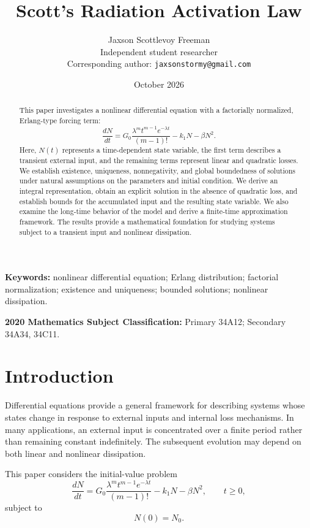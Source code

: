 \documentclass[12pt]{article}
\title{\textbf{Scott's Radiation Activation Law}}
\author{Jaxson Scottlevoy Freeman\\
\small Independent student researcher\\
\small Corresponding author: \texttt{jaxsonstormy@gmail.com}}
\date{October 2026}
\theoremstyle{definition}
\theoremstyle{remark}
\begin{document}
\maketitle

\begin{abstract}
This paper investigates a nonlinear differential equation
with a factorially normalized, Erlang-type forcing term:
\[
\frac{dN}{dt}
=
G_0\frac{\lambda^m t^{m-1}e^{-\lambda t}}{(m-1)!}
-k_1N-\beta N^2.
\]
Here, \(N(t)\) represents a time-dependent state variable,
the first term describes a transient external input, and
the remaining terms represent linear and quadratic losses.
We establish existence, uniqueness, nonnegativity, and
global boundedness of solutions under natural assumptions
on the parameters and initial condition. We derive an
integral representation, obtain an explicit solution in
the absence of quadratic loss, and establish bounds for
the accumulated input and the resulting state variable.
We also examine the long-time behavior of the model and
derive a finite-time approximation framework. The results
provide a mathematical foundation for studying systems
subject to a transient input and nonlinear dissipation.
\end{abstract}

\noindent\textbf{Keywords:} nonlinear differential equation;
Erlang distribution; factorial normalization; existence
and uniqueness; bounded solutions; nonlinear dissipation.

\medskip
\noindent\textbf{2020 Mathematics Subject Classification:}
Primary 34A12; Secondary 34A34, 34C11.

\section{Introduction}

Differential equations provide a general framework for
describing systems whose states change in response to
external inputs and internal loss mechanisms. In many
applications, an external input is concentrated over a
finite period rather than remaining constant indefinitely.
The subsequent evolution may depend on both linear and
nonlinear dissipation.

This paper considers the initial-value problem
\begin{equation}
\frac{dN}{dt}
=
G_0\frac{\lambda^m t^{m-1}e^{-\lambda t}}{(m-1)!}
-k_1N-\beta N^2,
\qquad t\geq 0,
\label{eq:model}
\end{equation}
subject to
\begin{equation}
N(0)=N_0.
\label{eq:initial-condition}
\end{equation}
\end{document}
